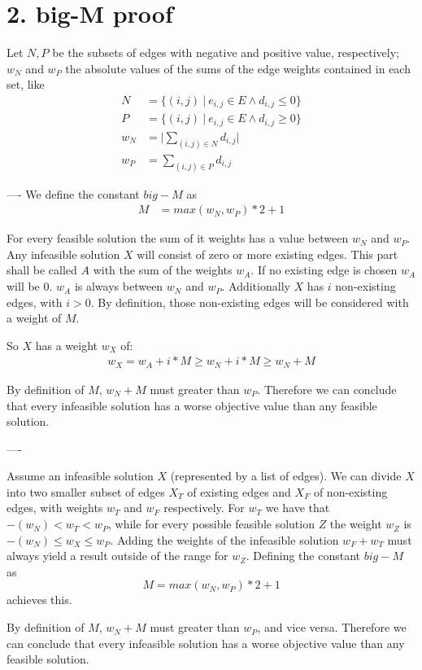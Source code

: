 
\section*{2. big-M proof}
Let $ N, P $ be the subsets of edges with negative and positive value, respectively; $ w_N $ and $ w_P $ the absolute values of the sums of the edge weights contained in each set, like
\begin{align*}
N &= \{(i,j) \: | \: e_{i,j} \in E \wedge d_{i,j} \leq 0 \} \\
P &= \{(i,j) \: | \: e_{i,j} \in E \wedge d_{i,j} \geq 0 \} \\
w_N &= \lvert \sum_{(i,j) \in N} d_{i,j} \rvert \\ 
w_P &= \sum_{(i,j) \in P} d_{i,j}  
\end{align*}


----
We define the constant $ big-M $ as
\begin{align*}
\textit{M} &= max( w_N , w_P ) * 2 + 1
\end{align*}

For every feasible solution the sum of it weights has a value between $w_N$ and $w_P$. Any infeasible solution $X$ will consist of zero or more existing edges. This part shall be called $A$ with the sum of the weights $w_A$. If no existing edge is chosen $w_A$ will be $0$. $w_A$ is always between $w_N$ and $w_P$. Additionally $X$ has $i$ non-existing edges, with $i>0$. By definition, those non-existing edges will be considered with a weight of $M$.

So $X$ has a weight $w_X$ of:
\begin{align*}
w_X = w_A + i * M \geq w_N + i * M \geq w_N + M
\end{align*}

By definition of $M$,  $w_N + M$ must greater than $w_P$. Therefore we can conclude that every infeasible solution has a worse objective value than any feasible solution.

----

Assume an infeasible solution $ X $ (represented by a list of edges). We can divide $ X $ into two smaller subset of edges $ X_T $ of existing edges and $ X_F $ of non-existing edges, with weights $ w_T $ and $ w_F $ respectively. For $ w_T $ we have that $ -(w_N) < w_T < w_P $, while for every possible feasible solution $ Z $  the weight $ w_Z $ is $ -(w_N) \leq w_X \leq w_P $. Adding the weights of the infeasible solution $ w_F + w_T$ must always yield a result outside of the range for $ w_Z $. Defining the constant $ big-M $ as
$$\textit{M}= max( w_N , w_P ) * 2 + 1$$
achieves this. 

By definition of $M$,  $w_N + M$ must greater than $w_P$, and vice versa. Therefore we can conclude that every infeasible solution has a worse objective value than any feasible solution.